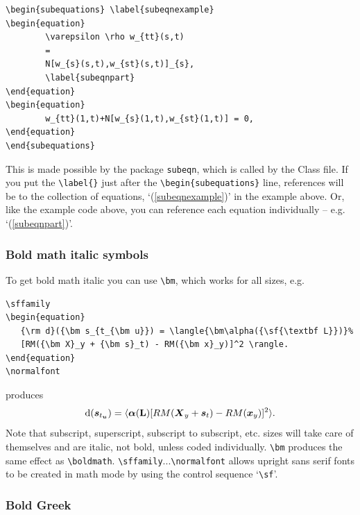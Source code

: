 \documentclass[]{cJEN2e}
\begin{document}
\begin{verbatim}
\begin{subequations} \label{subeqnexample}
\begin{equation}
        \varepsilon \rho w_{tt}(s,t)
        =
        N[w_{s}(s,t),w_{st}(s,t)]_{s},
        \label{subeqnpart}
\end{equation}
\begin{equation}
        w_{tt}(1,t)+N[w_{s}(1,t),w_{st}(1,t)] = 0,
\end{equation}
\end{subequations}
\end{verbatim}
This is made possible by the package {\tt{subeqn}}, which is called
by the Class file. If you put the \verb"\label{}" just after the
\verb"\begin{subequations}" line, references will be to the
collection of equations, `(\ref{subeqnexample})' in the example
above. Or, like the example code above, you can reference each
equation individually -- e.g. `(\ref{subeqnpart})'.

\subsubsection{Bold math italic symbols}

To get bold math italic you can use \verb"\bm", which works for
all sizes, e.g.
%
\begin{verbatim}
\sffamily
\begin{equation}
   {\rm d}({\bm s_{t_{\bm u}}) = \langle{\bm\alpha({\sf{\textbf L}})}%
   [RM({\bm X}_y + {\bm s}_t) - RM({\bm x}_y)]^2 \rangle.
\end{equation}
\normalfont
\end{verbatim}
%
produces\sffamily
\begin{equation}
   {\rm d}({\bm s_{t_{\bm u}}}) = \langle {\bm\alpha({\sf{\textbf L}})}[RM({\bm X}_y
   + {\bm s}_t) - RM({\bm x}_y)]^2 \rangle.
\end{equation}\normalfont
Note that subscript, superscript, subscript to subscript, etc.
sizes will take care of themselves and are italic, not bold,
unless coded individually. \verb"\bm" produces the same effect as
\verb"\boldmath". \verb"\sffamily"...\verb"\normalfont" allows
upright sans serif fonts to be created in math mode by using the
control sequence `\verb"\sf"'.



\subsubsection{Bold Greek}\label{boldgreek}
\end{document}
